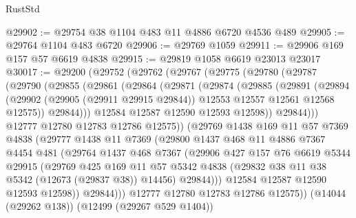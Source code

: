 \begin{lexlean}{RustStd}
\begin{coremodule}
@29902 := @29754 @38 @1104 @483 @11 @4886 @6720 @4536 @489
@29905 := @29764 @1104 @483 @6720
@29906 := @29769 @1059
@29911 := @29906 @169 @157 @57 @6619 @4838
@29915 := @29819 @1058 @6619 @23013 @23017
@30017 := @29200
    (@29752
      (@29762
        (@29767
          (@29775
            (@29780
              (@29787
                (@29790
                  (@29855
                    (@29861
                      (@29864
                        (@29871
                          (@29874
                            (@29885
                              (@29891
                                (@29894
                                  (@29902
                                    (@29905 (@29911 @29915 @29844))
                                    @12553
                                    @12557
                                    @12561
                                    @12568
                                    @12575))
                                @29844)))
                          @12584
                          @12587
                          @12590
                          @12593
                          @12598))
                      @29844)))
                @12777
                @12780
                @12783
                @12786
                @12575))
            (@29769
              @1438
              @169
              @11
              @57
              @7369
              @4838
              (@29777
                @1438
                @11
                @7369
                (@29800
                  @1437
                  @468
                  @11
                  @4886
                  @7367
                  @4454
                  @481
                  (@29764
                    @1437
                    @468
                    @7367
                    (@29906
                      @427
                      @157
                      @76
                      @6619
                      @5344
                      @29915
                      (@29769
                        @425
                        @169
                        @11
                        @57
                        @5342
                        @4838
                        (@29832 @38 @11 @38 @5342 (@12673 (@29837 @38)) @14456)
                        @29844)))
                  @12584
                  @12587
                  @12590
                  @12593
                  @12598))
              @29844)))
        @12777
        @12780
        @12783
        @12786
        @12575))
    (@14044 (@29262 @138))
    (@12499 (@29267 @529 @1404))

\end{coremodule}
\end{lexlean}
